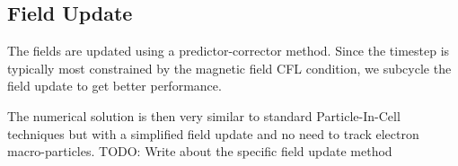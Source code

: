 \documentclass[]{article}
\begin{document}
\subsection*{Field Update}
The fields are updated using a predictor-corrector method.
Since the timestep is typically most constrained by the magnetic field CFL condition, we
subcycle the field update to get better performance.

The numerical solution is then very similar to standard Particle-In-Cell techniques 
but with a simplified field update and no need to track electron macro-particles.
TODO: Write about the specific field update method
\end{document}
